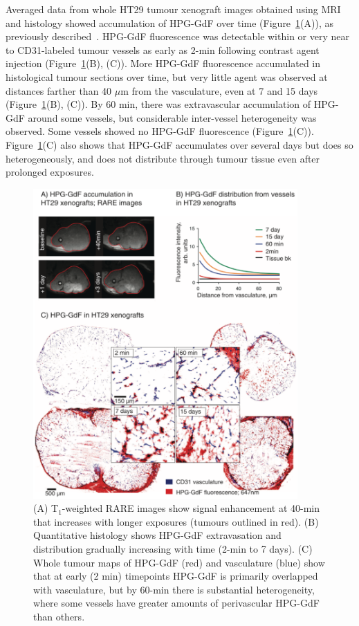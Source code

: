 Averaged data from whole HT29 tumour xenograft images obtained using MRI and histology showed accumulation of \acs{HPG-GdF} over time (Figure~\ref{hpgpaper1:fig3}(A)), as previously described~\cite{Saatchi:2012hc}.
\acs{HPG-GdF} fluorescence was detectable within or very near to \acs{CD31}-labeled tumour vessels as early as 2-min following contrast agent injection (Figure~\ref{hpgpaper1:fig3}(B), (C)).
More \acs{HPG-GdF} fluorescence accumulated in histological tumour sections over time, but very little agent was observed at distances farther than 40 $\mu$m from the vasculature, even at 7 and 15 days (Figure~\ref{hpgpaper1:fig3}(B), (C)).
By 60 min, there was extravascular accumulation of \acs{HPG-GdF} around some vessels, but considerable inter-vessel heterogeneity was observed.
Some vessels showed no \acs{HPG-GdF} fluorescence (Figure~\ref{hpgpaper1:fig3}(C)).
Figure~\ref{hpgpaper1:fig3}(C) also shows that \acs{HPG-GdF} accumulates over several days but does so heterogeneously, and does not distribute through tumour tissue even after prolonged exposures.

\begin{figure}[htbp]
 \includegraphics[width=0.9\textwidth]{hpg/hpg-paper1-images/hpg_fig3-hpgdistribution.png}
 \caption{(A) T$_1$-weighted \acs{RARE} images show signal enhancement at 40-min that increases with longer exposures (tumours outlined in red). (B) Quantitative histology shows \acs{HPG-GdF} extravasation and distribution gradually increasing with time (2-min to 7 days). (C) Whole tumour maps of \acs{HPG-GdF} (red) and vasculature (blue) show that at early (2 min) timepoints \acs{HPG-GdF} is primarily overlapped with vasculature, but by 60-min there is substantial heterogeneity, where some vessels have greater amounts of perivascular \acs{HPG-GdF} than others.}
 \label{hpgpaper1:fig3}
\end{figure}

